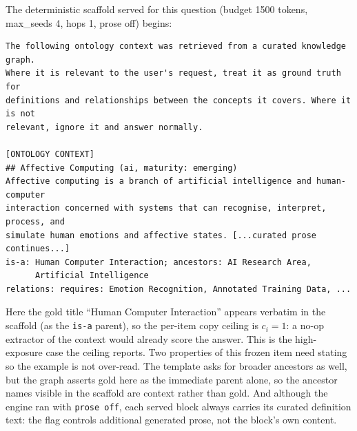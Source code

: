 \documentclass[10pt,twocolumn]{article}
\begin{document}
\noindent The deterministic scaffold served for this question (budget 1500 tokens, max\_seeds 4,
hops 1, prose off) begins:

{\footnotesize\begin{verbatim}
The following ontology context was retrieved from a curated knowledge graph.
Where it is relevant to the user's request, treat it as ground truth for
definitions and relationships between the concepts it covers. Where it is not
relevant, ignore it and answer normally.

[ONTOLOGY CONTEXT]
## Affective Computing (ai, maturity: emerging)
Affective computing is a branch of artificial intelligence and human-computer
interaction concerned with systems that can recognise, interpret, process, and
simulate human emotions and affective states. [...curated prose continues...]
is-a: Human Computer Interaction; ancestors: AI Research Area,
      Artificial Intelligence
relations: requires: Emotion Recognition, Annotated Training Data, ...
\end{verbatim}}

\noindent Here the gold title ``Human Computer Interaction'' appears verbatim in the scaffold
(as the \texttt{is-a} parent), so the per-item copy ceiling is $c_i=1$: a no-op extractor of the
context would already score the answer. This is the high-exposure case the ceiling reports.
Two properties of this frozen item need stating so the example is not over-read. The template asks for
broader ancestors as well, but the graph asserts gold here as the immediate parent alone, so the ancestor
names visible in the scaffold are context rather than gold. And although the engine ran with
\texttt{prose~off}, each served block always carries its curated definition text: the flag controls
additional generated prose, not the block's own content.

\twocolumn
\printbibliography
\end{document}
